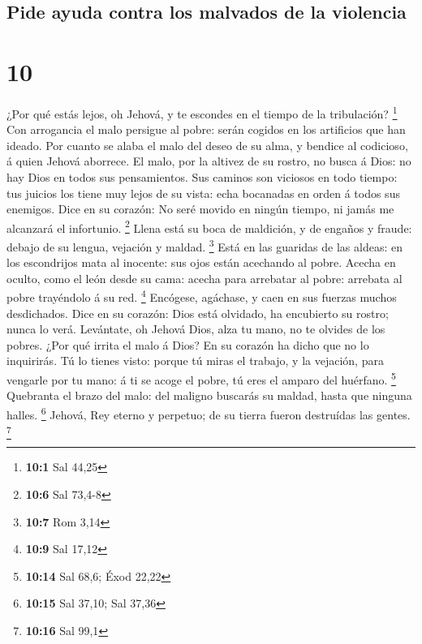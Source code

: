 \hypertarget{pide-ayuda-contra-los-malvados-de-la-violencia}{%
\subsection{Pide ayuda contra los malvados de la
violencia}\label{pide-ayuda-contra-los-malvados-de-la-violencia}}

\hypertarget{section-9}{%
\section{10}\label{section-9}}

 ¿Por qué estás lejos, oh Jehová, y te escondes en el tiempo
de la tribulación? \footnote{\textbf{10:1} Sal 44,25}  Con
arrogancia el malo persigue al pobre: serán cogidos en los artificios
que han ideado.  Por cuanto se alaba el malo del deseo de su
alma, y bendice al codicioso, á quien Jehová aborrece.  El
malo, por la altivez de su rostro, no busca á Dios: no hay Dios en todos
sus pensamientos.  Sus caminos son viciosos en todo tiempo:
tus juicios los tiene muy lejos de su vista: echa bocanadas en orden á
todos sus enemigos.  Dice en su corazón: No seré movido en
ningún tiempo, ni jamás me alcanzará el infortunio. \footnote{\textbf{10:6}
  Sal 73,4-8}  Llena está su boca de maldición, y de engaños
y fraude: debajo de su lengua, vejación y maldad. \footnote{\textbf{10:7}
  Rom 3,14}  Está en las guaridas de las aldeas: en los
escondrijos mata al inocente: sus ojos están acechando al pobre.
 Acecha en oculto, como el león desde su cama: acecha para
arrebatar al pobre: arrebata al pobre trayéndolo á su red. \footnote{\textbf{10:9}
  Sal 17,12}  Encógese, agáchase, y caen en sus fuerzas
muchos desdichados.  Dice en su corazón: Dios está
olvidado, ha encubierto su rostro; nunca lo verá. 
Levántate, oh Jehová Dios, alza tu mano, no te olvides de los pobres.
 ¿Por qué irrita el malo á Dios? En su corazón ha dicho que
no lo inquirirás.  Tú lo tienes visto: porque tú miras el
trabajo, y la vejación, para vengarle por tu mano: á ti se acoge el
pobre, tú eres el amparo del huérfano. \footnote{\textbf{10:14} Sal
  68,6; Éxod 22,22}  Quebranta el brazo del malo: del
maligno buscarás su maldad, hasta que ninguna halles. \footnote{\textbf{10:15}
  Sal 37,10; Sal 37,36}  Jehová, Rey eterno y perpetuo; de
su tierra fueron destruídas las gentes. \footnote{\textbf{10:16} Sal
  99,1}

